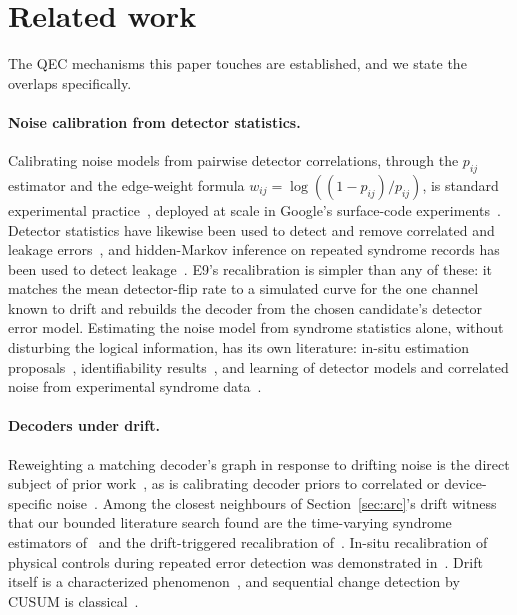 \section{Related work}
\label{sec:related}

The QEC mechanisms this paper touches are established, and we state the overlaps specifically.

\paragraph{Noise calibration from detector statistics.} Calibrating noise models from pairwise detector correlations, through the $p_{ij}$ estimator and the edge-weight formula $w_{ij} = \log((1-p_{ij})/p_{ij})$, is standard experimental practice~\cite{fowler2014scalable,chen2021exponential}, deployed at scale in Google's surface-code experiments~\cite{google2023suppressing,acharya2025belowthreshold}. Detector statistics have likewise been used to detect and remove correlated and leakage errors~\cite{mcewen2021removing}, and hidden-Markov inference on repeated syndrome records has been used to detect leakage~\cite{bultink2020leakage,varbanov2020hmm}. E9's recalibration is simpler than any of these: it matches the mean detector-flip rate to a simulated curve for the one channel known to drift and rebuilds the decoder from the chosen candidate's detector error model. Estimating the noise model from syndrome statistics alone, without disturbing the logical information, has its own literature: in-situ estimation proposals~\cite{fujiwara2014instantaneous,combes2014insitu}, identifiability results~\cite{wagner2021optimal,wagner2022paulichannels}, and learning of detector models and correlated noise from experimental syndrome data~\cite{chen2022calibrated,harper2023correlated,gicev2024syndrome,remm2025syndromecorrelations,blumekohout2025dem}.

\paragraph{Decoders under drift.} Reweighting a matching decoder's graph in response to drifting noise is the direct subject of prior work~\cite{spitz2018adaptive,huo2017realtime,dgr2023reweighting}, as is calibrating decoder priors to correlated or device-specific noise~\cite{nickerson2019correlated,sivak2024priors}. Among the closest neighbours of Section~\ref{sec:arc}'s drift witness that our bounded literature search found are the time-varying syndrome estimators of~\cite{kobori2025bayesian,bhardwaj2025drifting} and the drift-triggered recalibration of~\cite{poster2026reloqate}. In-situ recalibration of physical controls during repeated error detection was demonstrated in~\cite{kelly2016insitucalibration}. Drift itself is a characterized phenomenon~\cite{proctor2020drift}, and sequential change detection by CUSUM is classical~\cite{page1954continuous}.

